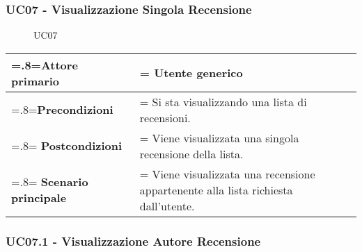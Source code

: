         \subsubsection{UC07 - Visualizzazione Singola Recensione}
        \label{UC07}

            \begin{figure}[H]
                \centering
                
                \caption{UC07}
            \end{figure}

            \begin{center}
                \renewcommand{\arraystretch}{1.5}
                \renewcommand\tabularxcolumn[1]{m{#1}}
                \begin{tabularx}{0.9\textwidth} {
                    >{\hsize=.8\hsize\linewidth=\hsize}X
                    >{\hsize=1.2\hsize\linewidth=\hsize}X}
                    \hline
                    \textbf{Attore primario} & Utente generico \\
                    \hline
                    \textbf{Precondizioni} & Si sta visualizzando una lista di recensioni. \\
                    \hline
                    \textbf{Postcondizioni} & Viene visualizzata una singola recensione della lista. \\
                    \hline
                    \textbf{Scenario principale} & Viene visualizzata una recensione appartenente alla lista richiesta dall'utente. \\
                    \hline
                \end{tabularx}
            \end{center}

        \subsubsection{UC07.1 - Visualizzazione Autore Recensione}
        \label{UC07.1}


